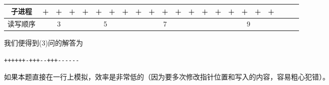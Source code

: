 \begin{problems}
\begin{table}[H]
\begin{tabular}{cccc|cccccccccccccccccc}
                子进程 & \cellcolor{blue!10}+ & \cellcolor{blue!10}+ & \cellcolor{blue!10}+ & \cellcolor{blue!10}+ & \cellcolor{blue!10}+ & \cellcolor{blue!10}+ & \multicolumn{1}{c|}{+} & \cellcolor{blue!10}+ & \cellcolor{blue!10}+ & \cellcolor{blue!10}+ & + & \multicolumn{1}{c|}{+} & \cellcolor{blue!10}+ & \cellcolor{blue!10}+ & \cellcolor{blue!10}+ & + & + & + &  &  &  \\ \hline
                读写顺序 & \multicolumn{3}{c|}{3} & \multicolumn{4}{c|}{5} & \multicolumn{5}{c|}{7} & \multicolumn{9}{c}{9}
            \end{tabular}
        \end{table}
        我们便得到(3)问的解答为
        \begin{center}
            \verb|++++++-+++--+++------|
        \end{center}
        如果本题直接在一行上模拟，效率是非常低的（因为要多次修改指针位置和写入的内容，容易粗心犯错）。


\end{problems}
